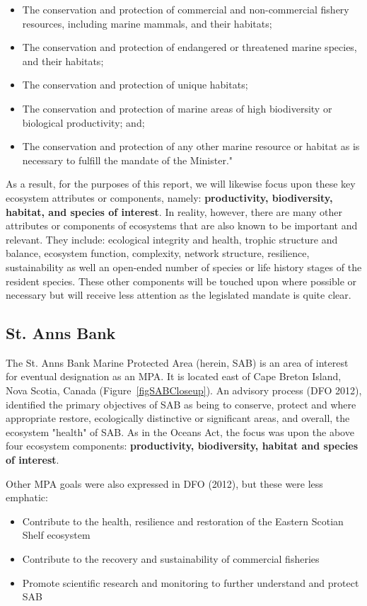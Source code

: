 \documentclass[letterpaper,portrait,11pt]{scrartcl}
\numberwithin{equation}{section}		%
\numberwithin{figure}{section}			%
\numberwithin{table}{section}				%
\begin{document}
\begin{itemize}
  \item The conservation and protection of commercial and non-commercial fishery resources, including marine mammals, and their habitats; 
  \item The conservation and protection of endangered or threatened marine species, and their habitats; 
  \item The conservation and protection of unique habitats; 
  \item The conservation and protection of marine areas of high biodiversity or biological productivity; and; 
  \item The conservation and protection of any other marine resource or habitat as is necessary to fulfill the mandate of the Minister."
\end{itemize}

As a result, for the purposes of this report, we will likewise focus upon these key ecosystem attributes or components, namely: \textbf{productivity, biodiversity, habitat, and  species of interest}. In reality, however, there are many other attributes or components of ecosystems that are also known to be important and relevant. They include: ecological integrity and health, trophic structure and balance, ecosystem function, complexity, network structure, resilience, sustainability as well an open-ended number of species or life history stages of the resident species. These other components will be touched upon where possible or necessary but will receive less attention as the legislated mandate is quite clear. 

\subsection{St. Anns Bank}
The St. Anns Bank Marine Protected Area (herein, SAB) is an area of interest for eventual designation as an MPA. It is located east of Cape Breton Island, Nova Scotia, Canada (Figure~\ref{figSABCloseup}). An advisory process (DFO 2012), identified the primary objectives of SAB as being to conserve, protect and where appropriate restore, ecologically distinctive or significant areas, and overall, the ecosystem "health" of SAB. As in the Oceans Act, the focus was upon the above four ecosystem components: \textbf{productivity, biodiversity, habitat and species of interest}.

Other MPA goals were also expressed in DFO (2012), but these were less emphatic:

\begin{itemize}
	\item Contribute to the health, resilience and restoration of the Eastern Scotian Shelf ecosystem
	\item Contribute to the recovery and sustainability of commercial fisheries 
	\item Promote scientific research and monitoring to further understand and protect SAB
\end{itemize}
\end{document}
